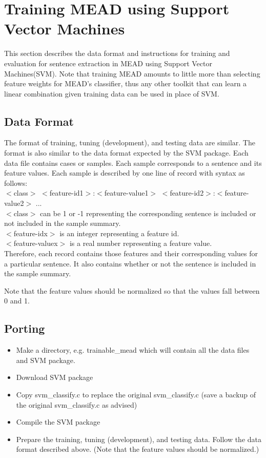 \documentclass[10pt]{article}
\begin{document}
\section {Training MEAD using Support Vector Machines}

This section describes the data format and instructions
for training and evaluation for sentence extraction in MEAD
using Support Vector Machines(SVM).  Note that training 
MEAD amounts to little more than selecting feature weights
for MEAD's classifier, thus any other toolkit that can learn
a linear combination given training data can be used in place
of SVM.

\subsection {Data Format}
The format of training, tuning (development), and testing data
are similar.  The format is also similar to the data format
expected by the SVM package.
Each data file contains cases or samples.
Each sample corresponds to a sentence and its feature values.
Each sample is described by one line of record with syntax
as follows:\\

$<$class$>$ $<$feature-id1$>$:$<$feature-value1$>$
$<$feature-id2$>$:$<$feature-value2$>$ ...
\\

$<$class$>$ can be 1 or -1 representing the corresponding sentence
is included or not included in the sample summary.
\\

$<$feature-idx$>$ is an integer representing a feature id.
\\

$<$feature-valuex$>$ is a real number representing a feature value.
\\

Therefore, each record contains those features and their
corresponding values for a particular sentence.  It also
contains whether or not the sentence is included in the sample
summary.

Note that the feature values should be normalized so that the values
fall between 0 and 1.

\subsection{Porting}

\begin {itemize}
\item Make a directory, e.g. trainable\_mead which will contain all the
data files and SVM package.
\item Download SVM package
\item Copy svm\_classify.c to replace the original
svm\_classify.c
(save a backup of the original svm\_classify.c as advised)
\item Compile the SVM package
\item Prepare the training, tuning (development), and testing
data.  Follow the data format described above.  (Note that the
feature values should be normalized.)
\end{itemize}
\end{document}
